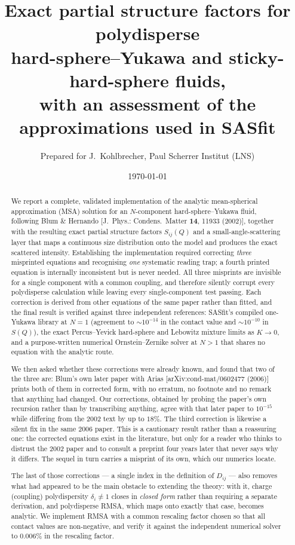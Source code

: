 \documentclass[11pt,a4paper]{article}
\title{\bfseries Exact partial structure factors for polydisperse\\
hard-sphere--Yukawa and sticky-hard-sphere fluids,\\
with an assessment of the approximations used in SASfit}
\author{Prepared for J.\ Kohlbrecher, Paul Scherrer Institut (LNS)}
\date{\today}
\begin{document}
\maketitle

\begin{abstract}
\noindent
We report a complete, validated implementation of the analytic mean-spherical
approximation (MSA) solution for an $N$-component hard-sphere--Yukawa fluid,
following Blum \& Hernando [J.~Phys.: Condens.\ Matter \textbf{14}, 11933
(2002)], together with the resulting exact partial structure factors
$S_{ij}(Q)$ and a small-angle-scattering layer that maps a continuous size
distribution onto the model and produces the exact scattered intensity.
Establishing the implementation required correcting \emph{three} misprinted
equations and recognising \emph{one} systematic reading trap; a fourth printed
equation is internally inconsistent but is never needed. All three misprints
are invisible for a single component with a common coupling, and therefore
silently corrupt every polydisperse calculation while leaving every
single-component test passing. Each correction is derived from other equations
of the same paper rather than fitted, and the final result is verified against
three independent references: SASfit's compiled one-Yukawa library at $N=1$
(agreement to $\sim\!10^{-14}$ in the contact value and $\sim\!10^{-10}$ in
$S(Q)$), the exact Percus--Yevick hard-sphere and Lebowitz mixture limits as
$K\to0$, and a purpose-written numerical Ornstein--Zernike solver at $N>1$ that
shares no equation with the analytic route.

We then asked whether these corrections were already known, and found that two
of the three are: Blum's own later paper with Arias
[arXiv:cond-mat/0602477 (2006)] prints both of them in corrected form, with no
erratum, no footnote and no remark that anything had changed. Our corrections,
obtained by probing the paper's own recursion rather than by transcribing
anything, agree with that later paper to $10^{-15}$ while differing from the
2002 text by up to $18\%$. The third correction is likewise a silent fix in the
same 2006 paper. This is a cautionary result rather than a reassuring one: the
corrected equations exist in the literature, but only for a reader who thinks
to distrust the 2002 paper and to consult a preprint four years later that
never says why it differs. The sequel in turn carries a misprint of its own,
which our numerics locate.

The last of those corrections --- a single index in the definition of
$D_{ij}$ --- also removes what had appeared to be the main obstacle to
extending the theory: with it, charge (coupling) polydispersity
$\delta_i\neq1$ closes in \emph{closed form} rather than requiring a separate
derivation, and polydisperse RMSA, which maps onto exactly that case, becomes
analytic. We implement RMSA with a common rescaling factor chosen so that all
contact values are non-negative, and verify it against the independent
numerical solver to $0.006\%$ in the rescaling factor.


\end{abstract}
\end{document}
